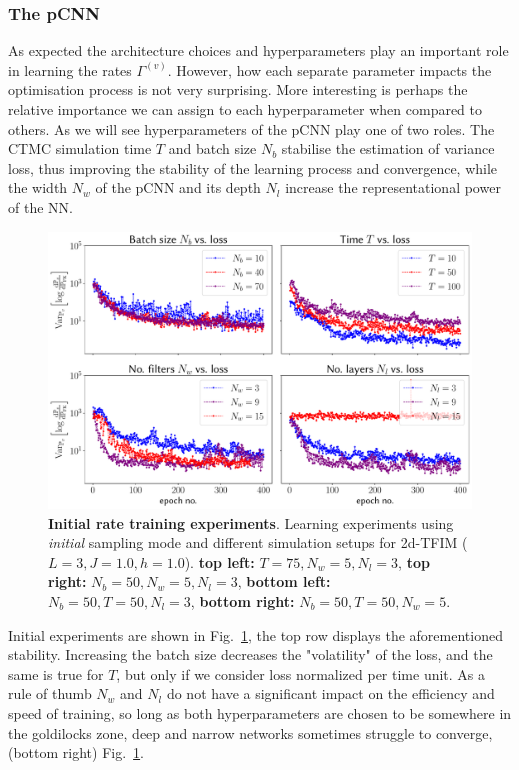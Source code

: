 \subsubsection{The pCNN}
As expected the architecture choices and hyperparameters play an important role in learning the rates $\Gamma^{(v)}$. However, how each separate parameter impacts the optimisation process is not very surprising. More interesting is perhaps the relative importance we can assign to each hyperparameter when compared to others. As we will see hyperparameters of the pCNN play one of two roles. The CTMC simulation time $T$ and batch size $N_b$ stabilise the estimation of variance loss, thus improving the stability of the learning process and convergence, while the width $N_w$ of the pCNN and its depth $N_l$ increase the representational power of the NN.
\begin{figure}[H]
	\centering
	\includegraphics[width=\linewidth]{Chapter5/Figs/Vector/init_test_learning}
	\caption[Initial rate training experiments]{\textbf{Initial rate training experiments}. Learning experiments using \emph{initial} sampling mode and different simulation setups for 2d-TFIM ($L=3, J=1.0, h=1.0$). \textbf{top left:} $T = 75, N_w = 5, N_l = 3$, \textbf{top right:} $N_b = 50, N_w = 5, N_l = 3$, \textbf{bottom left:} $N_b = 50, T = 50, N_l = 3$, \textbf{bottom right:} $N_b = 50, T = 50, N_w = 5$.}
	\label{fig:inittestlearning}
\end{figure}
Initial experiments are shown in Fig.~\ref{fig:inittestlearning}, the top row displays the aforementioned stability. Increasing the batch size decreases the "volatility" of the loss, and the same is true for $T$, but only if we consider loss normalized per time unit. As a rule of thumb $N_w$ and $N_l$ do not have a significant impact on the efficiency and speed of training, so long as both hyperparameters are chosen to be somewhere in the goldilocks zone, deep and narrow networks sometimes struggle to converge, (bottom right) Fig.~\ref{fig:inittestlearning}.

